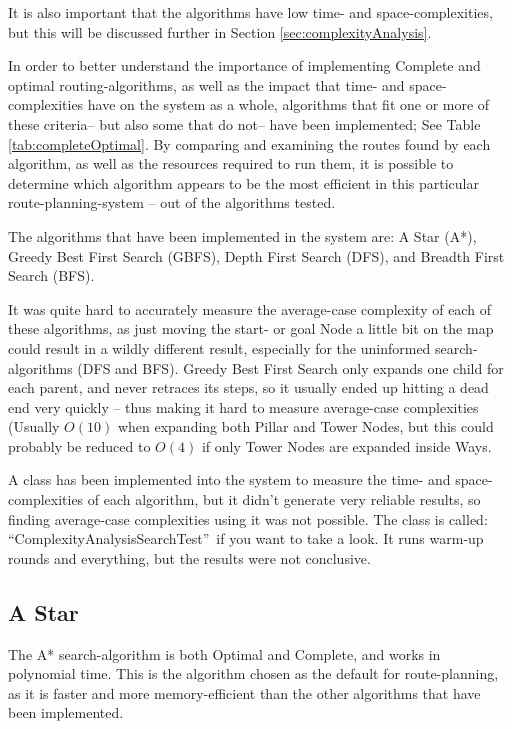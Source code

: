 It is also important that the algorithms have low time- and space-complexities, but this will be discussed further in Section \ref{sec:complexityAnalysis}.

In order to better understand the importance of implementing Complete and optimal routing-algorithms, as well as the impact that time- and space-complexities have on the system as a whole, algorithms that fit one or more of these criteria-- but also some that do not-- have been implemented; See Table \ref{tab:completeOptimal}. By comparing and examining the routes found by each algorithm, as well as the resources required to run them, it is possible to determine which algorithm appears to be the most efficient in this particular route-planning-system -- out of the algorithms tested.

The algorithms that have been implemented in the system are: A Star (A*), Greedy Best First Search (GBFS), Depth First Search (DFS), and Breadth First Search (BFS).

It was quite hard to accurately measure the average-case complexity of each of these algorithms, as just moving the start- or goal Node a little bit on the map could result in a wildly different result, especially for the uninformed search-algorithms (DFS and BFS). Greedy Best First Search only expands one child for each parent, and never retraces its steps, so it usually ended up hitting a dead end very quickly -- thus making it hard to measure average-case complexities (Usually $O(10)$ when expanding both Pillar and Tower Nodes, but this could probably be reduced to $O(4)$ if only Tower Nodes are expanded inside Ways.

A class has been implemented into the system to measure the time- and space-complexities of each algorithm, but it didn't generate very reliable results, so finding average-case complexities using it was not possible. The class is called: \textquotedblleft ComplexityAnalysisSearchTest\textquotedblright~if you want to take a look. It runs warm-up rounds and everything, but the results were not conclusive.

\subsection{A Star}
The A* search-algorithm is both Optimal and Complete, and works in polynomial time. This is the algorithm chosen as the default for route-planning, as it is faster and more memory-efficient than the other algorithms that have been implemented.

